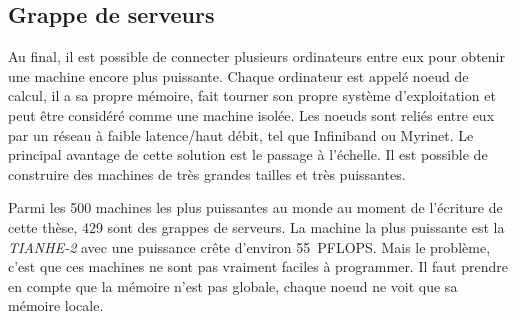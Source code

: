 \subsection{Grappe de serveurs}
Au final, il est possible de connecter plusieurs ordinateurs entre eux pour obtenir une machine encore plus puissante.
%
Chaque ordinateur est appelé noeud de calcul, il a sa propre mémoire, fait tourner son propre système d'exploitation et peut être considéré comme une machine isolée.
%
Les noeuds sont reliés entre eux par un réseau à faible latence/haut débit, tel que Infiniband ou Myrinet.
%
Le principal avantage de cette solution est le passage à l'échelle.
%
Il est possible de construire des machines de très grandes tailles et très puissantes.



Parmi les 500 machines les plus puissantes au monde au moment de l'écriture de cette thèse, 429 sont des grappes de serveurs.
%
La machine la plus puissante est la {\em TIANHE-2} avec une puissance crête d'environ 55~PFLOPS.
%
Mais le problème, c'est que ces machines ne sont pas vraiment faciles à programmer.
%
Il faut prendre en compte que la mémoire n'est pas globale, chaque noeud ne voit que sa mémoire locale.
